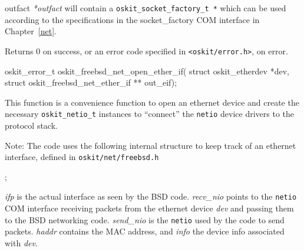 \begin{apiparm}
	\item[outfact] \emph{*outfact} will contain a 
	\texttt{oskit_socket_factory_t *} which can be used according to the
	specifications in the \oskit{} socket_factory COM interface in
	Chapter~\ref{net}.
\end{apiparm}

\begin{apiret}
        Returns 0 on success, or an error code specified in
        {\tt <oskit/error.h>}, on error.

\end{apiret}

%
%

\begin{apisyn}

	\funcproto oskit_error_t
		oskit_freebsd_net_open_ether_if(
		struct oskit_etherdev *dev,
		\outparam struct oskit_freebsd_net_ether_if ** out_eif);
\end{apisyn}
\ostonet

\begin{apidesc}
	This function is a convenience function to open an ethernet
	device and create the necessary \texttt{oskit_netio_t} instances 
	to ``connect'' the \texttt{netio} device drivers to the 
	protocol stack. 

	Note: The code uses the following internal structure to keep track
	of an ethernet interface, defined in \texttt{oskit/net/freebsd.h}

;

	\emph{ifp} is the actual interface as seen by the BSD code.
	\emph{recv_nio} points to the \texttt{netio} COM interface
	receiving packets from the ethernet device \emph{dev} and
	passing them to the BSD networking code. \emph{send_nio} is
	the \texttt{netio} used by the code to send packets.
	\emph{haddr} contains the MAC address, and \emph{info} the
	device info associated with \emph{dev}.

\end{apidesc}

